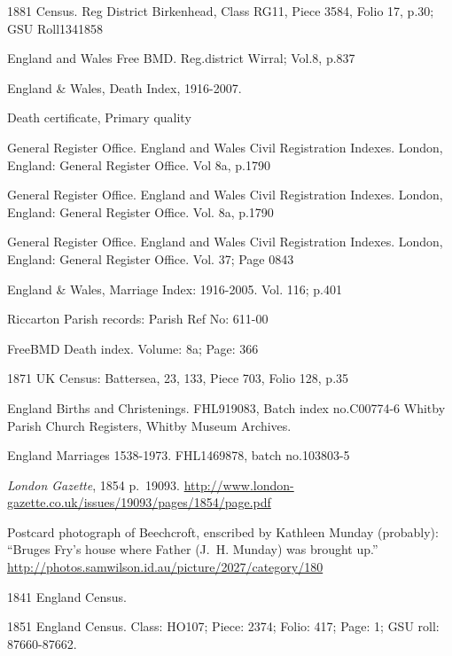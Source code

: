 \begin{thebibliography}{99}
	1881 Census. Reg District Birkenhead, Class RG11, Piece 3584, Folio 17, p.30; GSU Roll1341858
	
	England and Wales Free BMD. Reg.district Wirral; Vol.8, p.837
	
	England \& Wales, Death Index, 1916-2007.
	
	Death certificate, Primary quality
	
	General Register Office. England and Wales Civil Registration Indexes. London, England: General Register 		Office. Vol 8a, p.1790

	General Register Office. England and Wales Civil Registration Indexes. London, England: General Register 		Office. Vol. 8a, p.1790
	
	General Register Office. England and Wales Civil Registration Indexes. London, England: General Register 		Office. Vol. 37; Page 0843
	
	England \& Wales, Marriage Index: 1916-2005. Vol. 116; p.401

	Riccarton Parish records: Parish Ref No: 611-00
	
	FreeBMD Death index. Volume: 8a; Page: 366
	
	1871 UK Census: Battersea, 23, 133, Piece 703, Folio 128, p.35 
	
	 England Births and Christenings. FHL919083, Batch index no.C00774-6
	 Whitby Parish Church Registers, Whitby Museum Archives.
	 
	England Marriages 1538-1973. FHL1469878, batch no.103803-5

	\emph{London Gazette}, 1854 p.~19093.
	\url{http://www.london-gazette.co.uk/issues/19093/pages/1854/page.pdf}

	Postcard photograph of Beechcroft,
	enscribed by Kathleen Munday (probably):
	``Bruges Fry's house where Father (J.~H. Munday) was brought up.''
	\url{http://photos.samwilson.id.au/picture/2027/category/180}

	1841 England Census. 
	
	1851 England Census. Class: HO107; Piece: 2374; Folio: 417; Page: 1; GSU roll: 87660-87662.
	

\end{thebibliography}
